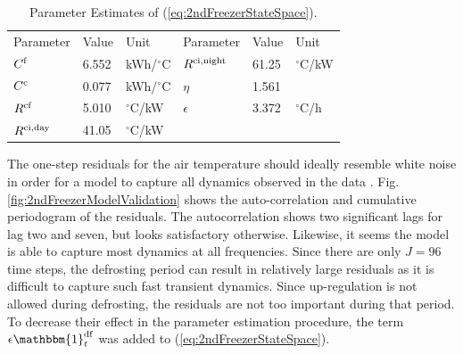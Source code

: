 \begin{table}[!t]
    \caption{Parameter Estimates of (\ref{eq:2ndFreezerStateSpace}).}
    \label{tab:parameter_estimates}
    \centering
    \begin{tabular}[b]{|l|l|l||l|l|l|}
        \hline
        Parameter                 & Value & Unit            & Parameter                   & Value & Unit           \\ \hhline{|=|=|=|=|=|=|}
        $C^{\rm{f}}$              & 6.552 & kWh/$^{\circ}$C & $R^{\rm{ci}, \text{night}}$ & 61.25 & $^{\circ}$C/kW \\
        $C^{\rm{c}}$              & 0.077 & kWh/$^{\circ}$C & $\eta$                      & 1.561 &                \\
        $R^{\rm{cf}}$             & 5.010 & $^{\circ}$C/kW  & $\epsilon$                  & 3.372 & $^{\circ}$C/h  \\
        $R^{\rm{ci}, \text{day}}$ & 41.05 & $^{\circ}$C/kW  &                             &       &                \\ \hline
    \end{tabular}
    \vspace{-2mm}
\end{table}





The one-step residuals for the air temperature should ideally resemble white noise in order for a model to capture all dynamics observed in the data \cite{madsen2007time}. Fig. \ref{fig:2ndFreezerModelValidation} shows the auto-correlation and cumulative periodogram of the residuals. The autocorrelation shows two significant lags for lag two and seven, but looks satisfactory otherwise. Likewise,  it seems the model is able to capture most dynamics at all frequencies.
%
Since there are only $J = 96$ time steps, the defrosting period can result in relatively large residuals as it is difficult to capture such fast transient dynamics. Since up-regulation is not allowed during defrosting, the residuals are not too important during that period. To decrease their effect in the parameter estimation procedure, the term $ \epsilon \mathbbm{1}^{\rm{df}}_{t}$ was added to (\ref{eq:2ndFreezerStateSpace}).

